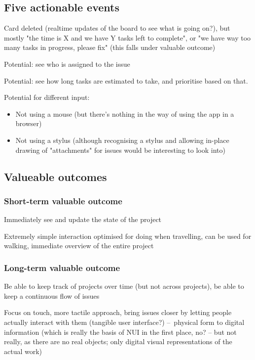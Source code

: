 \subsection{Five actionable events}

Card deleted (realtime updates of the board to see what is going on?), but mostly "the time is X and we have Y tasks left to complete", or "we have way too many tasks in progress, please fix" (this falls under valuable outcome)

Potential: see who is assigned to the issue

Potential: see how long tasks are estimated to take, and prioritise based on that.

Potential for different input:
\begin{itemize}
  \item Not using a mouse (but there's nothing in the way of using the app in a browser)
  \item Not using a stylus (although recognising a stylus and allowing in-place drawing of "attachments" for issues would be interesting to look into)
\end{itemize}

\subsection{Valueable outcomes}

\subsubsection{Short-term valuable outcome}

Immediately see and update the state of the project

Extremely simple interaction optimised for doing when travelling, can be used for walking, immediate overview of the entire project

\subsubsection{Long-term valuable outcome}

Be able to keep track of projects over time (but not across projects), be able to keep a continuous flow of issues %

Focus on touch, more tactile approach, bring issues closer by letting people actually interact with them (tangible user interface?) – physical form to digital information (which is really the basis of NUI in the first place, no? – but not really, as there are no real objects; only digital visual representations of the actual work)
